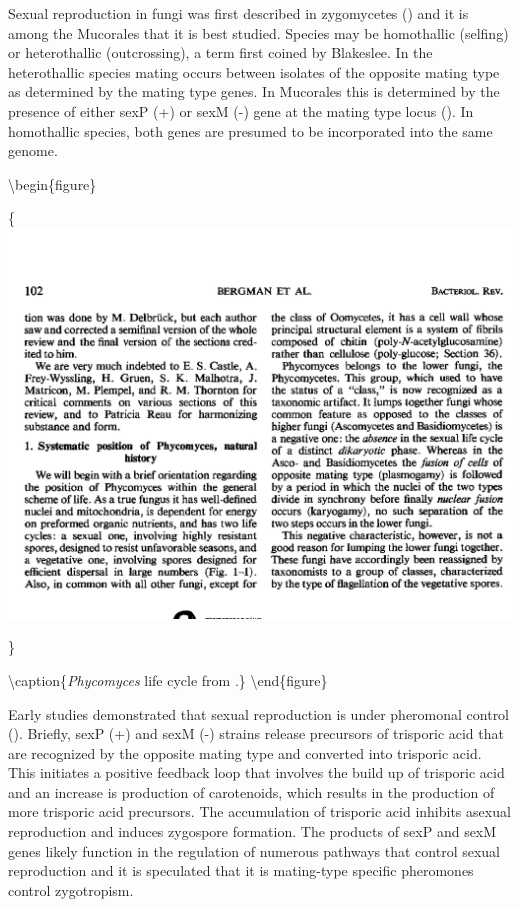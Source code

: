 \documentclass[]{book}
\begin{document}
Sexual reproduction in fungi was first described in zygomycetes (\citet{Blakeslee_1904}) and it is among the Mucorales that it is best studied. Species may be homothallic (selfing) or heterothallic (outcrossing), a term first coined by Blakeslee. In the heterothallic species mating occurs between isolates of the opposite mating type as determined by the mating type genes. In Mucorales this is determined by the presence of either sexP (+) or sexM (-) gene at the mating type locus (\citet{Alexopoulos_1996}). In homothallic species, both genes are presumed to be incorporated into the same genome.

\textbackslash begin\{figure\}

\{\centering \includegraphics[width=15.13in]{img/Ch10_Fig1}

\}

\textbackslash caption\{\emph{Phycomyces} life cycle from \citet{Bergman_1969}.\}\label{fig:ch10fig1}
\textbackslash end\{figure\}

Early studies demonstrated that sexual reproduction is under pheromonal control (\citet{Burgeff_1924}). Briefly, sexP (+) and sexM (-) strains release precursors of trisporic acid that are recognized by the opposite mating type and converted into trisporic acid. This initiates a positive feedback loop that involves the build up of trisporic acid and an increase is production of carotenoids, which results in the production of more trisporic acid precursors. The accumulation of trisporic acid inhibits asexual reproduction and induces zygospore formation. The products of sexP and sexM genes likely function in the regulation of numerous pathways that control sexual reproduction and it is speculated that it is mating-type specific pheromones control zygotropism.
\end{document}
